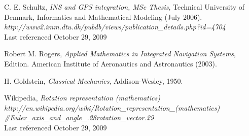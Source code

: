 \documentclass{gen-j-l}
\theoremstyle{definition}
\theoremstyle{remark}
\numberwithin{equation}{section}
\begin{document}

\begin{thebibliography}{99}
C. E. Schultz, {\it INS and GPS integration,  MSc Thesis}, 
Technical University of Denmark,
Informatics and Mathematical Modeling (July 2006). \\
{\em http://www2.imm.dtu.dk/pubdb/views/publication\_details.php?id=4704 }\\ 
{\small Last referenced October 29, 2009}

Robert M. Rogers, {\it Applied Mathematics in Integrated 
Navigation Systems},  Edition.  American Institute of 
Aeronautics and Astronautics (2003).

H. Goldstein, {\it Classical Mechanics}, Addison-Wesley, 1950. 

Wikipedia, {\it Rotation representation (mathematics)}\\
{\em http://en.wikipedia.org/wiki/Rotation\_representation\_(mathematics) \\
\#Euler\_axis\_and\_angle\_.28rotation\_vector.29}\\
{\small Last referenced October 29, 2009}
 
\end{thebibliography}
\end{document}
